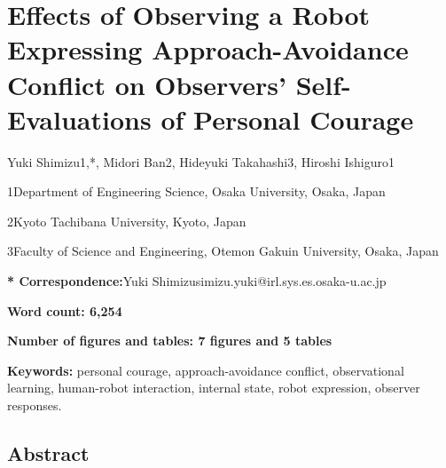 \documentclass[
]{article}
\author{}
\date{}
\begin{document}
\section{Effects of Observing a Robot Expressing Approach-Avoidance
Conflict on Observers' Self-Evaluations of Personal
Courage}\label{effects-of-observing-a-robot-expressing-approach-avoidance-conflict-on-observers-self-evaluations-of-personal-courage}

Yuki Shimizu1,*, Midori Ban2, Hideyuki Takahashi3, Hiroshi Ishiguro1

1Department of Engineering Science, Osaka University, Osaka, Japan

2Kyoto Tachibana University, Kyoto, Japan

3Faculty of Science and Engineering, Otemon Gakuin University, Osaka,
Japan

\textbf{* Correspondence:}Yuki
Shimizusimizu.yuki@irl.sys.es.osaka-u.ac.jp

\textbf{Word count: 6,254}

\textbf{Number of figures and tables: 7 figures and 5 tables}

\textbf{Keywords:} personal courage, approach-avoidance conflict,
observational learning, human-robot interaction, internal state, robot
expression, observer responses.

\subsection{Abstract}\label{abstract}
\end{document}
